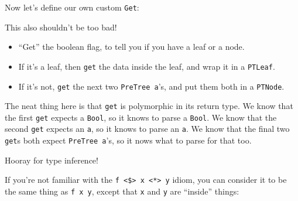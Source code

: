 \documentclass[]{article}
\newenvironment{Shaded}{}{}
\newcommand{\CommentTok}[1]{\textcolor[rgb]{0.38,0.63,0.69}{\textit{#1}}}
\newcommand{\DataTypeTok}[1]{\textcolor[rgb]{0.56,0.13,0.00}{#1}}
\newcommand{\DecValTok}[1]{\textcolor[rgb]{0.25,0.63,0.44}{#1}}
\newcommand{\KeywordTok}[1]{\textcolor[rgb]{0.00,0.44,0.13}{\textbf{#1}}}
\newcommand{\NormalTok}[1]{#1}
\newcommand{\OperatorTok}[1]{\textcolor[rgb]{0.40,0.40,0.40}{#1}}
\newcommand{\OtherTok}[1]{\textcolor[rgb]{0.00,0.44,0.13}{#1}}
\begin{document}
Now let's define our own custom \texttt{Get}:

\begin{Shaded}
\end{Shaded}

This also shouldn't be too bad!

\begin{itemize}
\tightlist
\item
  ``Get'' the boolean flag, to tell you if you have a leaf or a node.
\item
  If it's a leaf, then \texttt{get} the data inside the leaf, and wrap it in a
  \texttt{PTLeaf}.
\item
  If it's not, \texttt{get} the next two \texttt{PreTree\ a}'s, and put them
  both in a \texttt{PTNode}.
\end{itemize}

The neat thing here is that \texttt{get} is polymorphic in its return type. We
know that the first \texttt{get} expects a \texttt{Bool}, so it knows to parse a
\texttt{Bool}. We know that the second \texttt{get} expects an \texttt{a}, so it
knows to parse an \texttt{a}. We know that the final two \texttt{get}s both
expect \texttt{PreTree\ a}'s, so it nows what to parse for that too.

Hooray for type inference!

If you're not familiar with the
\texttt{f\ \textless{}\$\textgreater{}\ x\ \textless{}*\textgreater{}\ y} idiom,
you can consider it to be the same thing as \texttt{f\ x\ y}, except that
\texttt{x} and \texttt{y} are ``inside'' things:

\begin{Shaded}
\end{Shaded}
\end{document}
